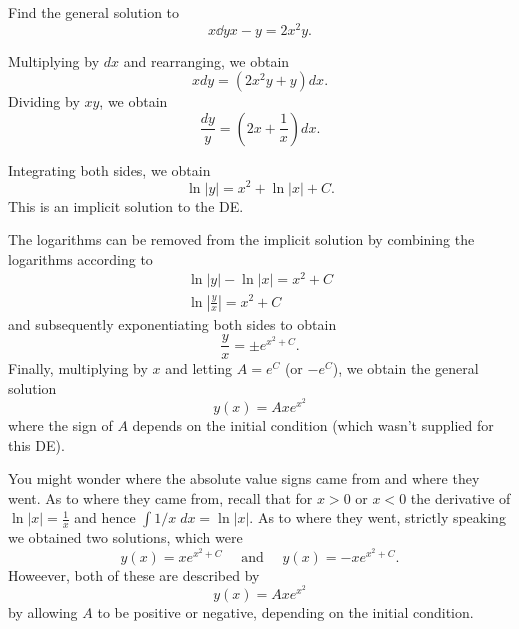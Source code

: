 \documentclass{book}
\begin{document}
\begin{example}
  Find the general solution to
  \begin{equation*}
    x \dd{y}{x} - y = 2 x^2 y.
  \end{equation*}
\end{example}

\begin{solution}

  Multiplying by $dx$ and rearranging, we obtain
  \begin{equation*}
    x dy = (2 x^2 y + y) dx.
  \end{equation*}
  Dividing by $x y$, we obtain
  \begin{equation*}
    \frac{dy}{y} = \left(2 x + \frac{1}{x}\right) dx.
  \end{equation*}


  Integrating both sides, we obtain
  \begin{equation*}
    \ln |y| = x^2 + \ln|x| + C.
  \end{equation*}
  This is an implicit solution to the DE.


  The logarithms can be removed from the implicit solution by
  combining the logarithms according to
  \begin{gather*}
    \ln|y| - \ln|x| = x^2 + C \\
    \ln\left| \frac{y}{x} \right| = x^2 + C
  \end{gather*}
  and subsequently exponentiating both sides to obtain
  \begin{equation*}
    \frac{y}{x} = \pm e^{x^2 + C}.
  \end{equation*}
  Finally, multiplying by $x$ and letting $A = e^C$ (or $-e^C$), we
  obtain the general solution
  \begin{equation*}
    y(x) = A x e^{x^2}
  \end{equation*}
  where the sign of $A$ depends on the initial condition (which wasn't
  supplied for this DE).
\end{solution}

\begin{heads}
  You might wonder where the absolute value signs came from and where
  they went.  As to where they came from, recall that for $x>0$ or
  $x<0$ the derivative of $\ln|x| = \frac{1}{x}$ and hence $\int 1/x
  \;dx = \ln|x|$.  As to where they went, strictly speaking we
  obtained two solutions, which were
  \begin{equation*}
    y(x) = x e^{x^2 + C} \quad \text{ and } \quad y(x) = -x e^{x^2 + C}.
  \end{equation*}
  Howeever, both of these are described by
  \begin{equation*}
    y(x) = A x e^{x^2}
  \end{equation*}
  by allowing $A$ to be positive or negative, depending on the initial
  condition.
\end{heads}
\end{document}
